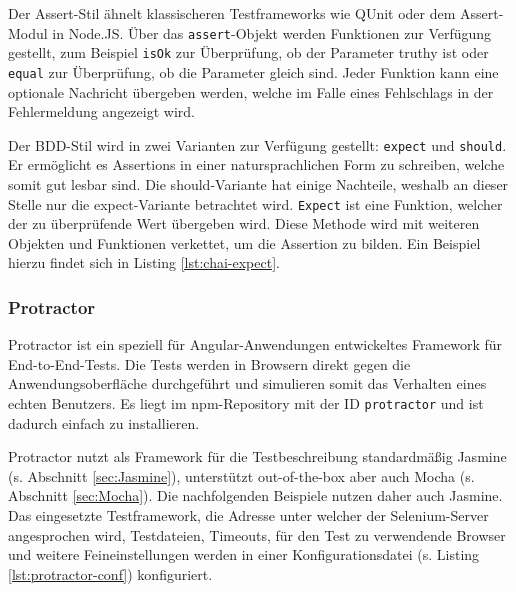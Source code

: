 Der Assert-Stil ähnelt klassischeren Testframeworks wie QUnit oder dem Assert-Modul in Node.JS. Über das \texttt{assert}-Objekt werden Funktionen zur Verfügung gestellt, zum Beispiel \texttt{isOk} zur Überprüfung, ob der Parameter truthy ist oder \texttt{equal} zur Überprüfung, ob die Parameter gleich sind. Jeder Funktion kann eine optionale Nachricht übergeben werden, welche im Falle eines Fehlschlags in der Fehlermeldung angezeigt wird.\cite{chai-assert}

Der BDD-Stil wird in zwei Varianten zur Verfügung gestellt: \texttt{expect} und \texttt{should}. Er ermöglicht es Assertions in einer natursprachlichen Form zu schreiben, welche somit gut lesbar sind. Die should-Variante hat einige Nachteile, weshalb an dieser Stelle nur die expect-Variante betrachtet wird. \texttt{Expect} ist eine Funktion, welcher der zu überprüfende Wert übergeben wird. Diese Methode wird mit weiteren Objekten und Funktionen verkettet, um die Assertion zu bilden.\cite{chai-styles} Ein Beispiel hierzu findet sich in Listing \ref{lst:chai-expect}.

\begin{figure}[H]
	
\end{figure}

\subsubsection{Protractor}
\label{sec:Protractor}
Protractor ist ein speziell für Angular-Anwendungen entwickeltes Framework für End-to-End-Tests. Die Tests werden in Browsern direkt gegen die Anwendungsoberfläche durchgeführt und simulieren somit das Verhalten eines echten Benutzers. Es liegt im npm-Repository mit der ID \texttt{protractor} und ist dadurch einfach zu installieren.\cite{protractor-index}

Protractor nutzt als Framework für die Testbeschreibung standardmäßig Jasmine (s. Abschnitt \ref{sec:Jasmine}), unterstützt out-of-the-box aber auch Mocha (s. Abschnitt \ref{sec:Mocha}). Die nachfolgenden Beispiele nutzen daher auch Jasmine. Das eingesetzte Testframework, die Adresse unter welcher der Selenium-Server angesprochen wird, Testdateien, Timeouts, für den Test zu verwendende Browser und weitere Feineinstellungen werden in einer Konfigurationsdatei (s. Listing \ref{lst:protractor-conf}) konfiguriert.

\begin{figure}[H]
	
\end{figure}

